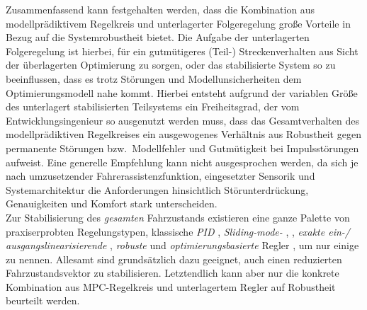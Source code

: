 Zusammenfassend kann festgehalten werden, dass die Kombination aus modellprädiktivem Regelkreis und unterlagerter Folgeregelung große Vorteile in Bezug auf die Systemrobustheit bietet. 
Die Aufgabe der unterlagerten Folgeregelung ist hierbei, für ein gutmütigeres (Teil-) Streckenverhalten aus Sicht der überlagerten Optimierung zu sorgen, oder das stabilisierte System so zu beeinflussen, dass es trotz Störungen und Modellunsicherheiten dem Optimierungsmodell nahe kommt.
Hierbei entsteht aufgrund der variablen Größe des unterlagert stabilisierten Teilsystems ein Freiheitsgrad, der vom Entwicklungsingenieur so ausgenutzt werden muss, dass das Gesamtverhalten des modellprädiktiven Regelkreises ein ausgewogenes Verhältnis aus Robustheit gegen permanente Störungen bzw.\ Modellfehler und Gutmütigkeit bei Impulsstörungen aufweist. Eine generelle Empfehlung kann nicht ausgesprochen werden, da sich je nach umzusetzender Fahrerassistenzfunktion, eingesetzter Sensorik und Systemarchitektur die Anforderungen hinsichtlich Störunterdrückung, Genauigkeiten und Komfort stark unterscheiden. \\
%
%
%
%
%
Zur Stabilisierung des \emph{gesamten} Fahrzustands existieren eine ganze Palette von praxiserprobten Regelungstypen, klassische \emph{PID} \cite{Muller-Bessler2006},  \emph{Sliding-mode-} \cite{eigel2010integrierte}, , \emph{exakte ein-/ ausgangslinearisierende} \cite{Konig2007, atSonderheft08, soehnitz} , \emph{robuste} \cite{walter_ecc2014, rathgeber_ecc2014} und \emph{optimierungsbasierte} Regler \cite{waldmann2009entwicklung, kessler2007konzept, weilkes2005zukunftige}, um nur einige zu nennen. Allesamt sind grundsätzlich dazu geeignet, auch einen reduzierten Fahrzustandsvektor zu stabilisieren. Letztendlich kann aber nur die konkrete Kombination aus MPC-Regelkreis und unterlagertem Regler auf Robustheit beurteilt werden.


